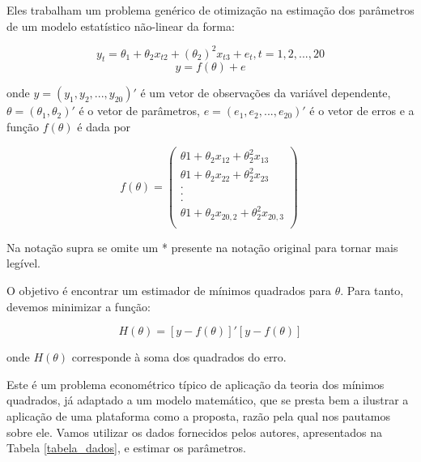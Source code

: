 \documentclass{abnt}
\begin{document}
Eles trabalham um problema genérico de otimização na estimação dos parâmetros de um modelo  estatístico não-linear da forma:

\[ y_t = \theta_1 + \theta_2 x_{t2} + (\theta_2)^2 x_{t3} +e_t , t = 1,2,...,20 \]
\[ y = f(\theta)+e\]


	onde $y = (y_1, y_2, ..., y_{20})'$ é um vetor de observações da variável dependente, $\theta = (\theta_1, \theta_2)'$ é o vetor de parâmetros, $e = (e_1, e_2, ..., e_{20})'$ é o vetor de erros e a função $f(\theta)$ é dada por 

\[ f(\theta)=
        \left( \begin{array}{ccc}
\theta1 + \theta_2 x_{12} + \theta_2^2 x_{13} \\
\theta1 + \theta_2 x_{22} + \theta_2^2 x_{23} \\
.\\
.\\
.\\
\theta1 + \theta_2 x_{20,2} + \theta_2^2 x_{20,3} \\

\end{array} \right)\
 \]

Na notação supra se omite um * presente na notação original para tornar mais legível.
 
 O objetivo é encontrar um estimador de mínimos quadrados para $\theta$. Para tanto, devemos minimizar a função:
 
\begin{equation}
  \label{eq_H}
  H(\theta) = [y - f(\theta)]'[y - f(\theta)] 
\end{equation}

onde $H(\theta)$ corresponde à soma dos quadrados do erro.


	Este é um problema econométrico típico de aplicação da teoria dos mínimos quadrados, já adaptado a um modelo matemático, que se presta bem a ilustrar a aplicação de uma plataforma como a proposta, razão pela qual nos pautamos sobre ele. Vamos utilizar os dados fornecidos pelos autores, apresentados na Tabela \ref{tabela_dados}, e estimar os parâmetros.
\end{document}
